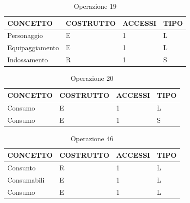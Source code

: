 \begin{table}[H]
\centering
\caption{Operazione 19}
\label{my-label}
\begin{tabular}{|l|l|l|l|}
\hline
\textbf{CONCETTO} & \textbf{COSTRUTTO} & \textbf{ACCESSI} & \textbf{TIPO} \\ \hline
Personaggio       & E                  & 1                & L             \\ \hline
Equipaggiamento   & E                  & 1                & L             \\ \hline
Indossamento      & R                  & 1                & S             \\ \hline
\end{tabular}
\end{table}

\begin{table}[H]
\centering
\caption{Operazione 20}
\label{my-label}
\begin{tabular}{|l|l|l|l|}
\hline
\textbf{CONCETTO} & \textbf{COSTRUTTO} & \textbf{ACCESSI} & \textbf{TIPO} \\ \hline
Consumo           & E                  & 1                & L             \\ \hline
Consumo           & E                  & 1                & S             \\ \hline
\end{tabular}
\end{table}


\begin{table}[H]
\centering
\caption{Operazione 46}
\label{my-label}
\begin{tabular}{|l|l|l|l|}
\hline
\textbf{CONCETTO} & \textbf{COSTRUTTO} & \textbf{ACCESSI} & \textbf{TIPO} \\ \hline
Consunto          & R                  & 1                & L             \\ \hline
Consumabili       & E                  & 1                & L             \\ \hline
Consumo           & E                  & 1                & L             \\ \hline
\end{tabular}
\end{table}





